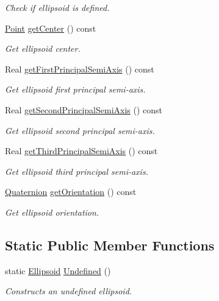 \begin{DoxyCompactItemize}
\begin{DoxyCompactList}\small\item\em Check if ellipsoid is defined. \end{DoxyCompactList}\item 
\hyperlink{classlibrary_1_1math_1_1geom_1_1d3_1_1objects_1_1_point}{Point} \hyperlink{classlibrary_1_1math_1_1geom_1_1d3_1_1objects_1_1_ellipsoid_a646be2506950d250db0fb6610979bb46}{get\+Center} () const
\begin{DoxyCompactList}\small\item\em Get ellipsoid center. \end{DoxyCompactList}\item 
Real \hyperlink{classlibrary_1_1math_1_1geom_1_1d3_1_1objects_1_1_ellipsoid_a8219b05b4c6afcd71e915d10b6129baf}{get\+First\+Principal\+Semi\+Axis} () const
\begin{DoxyCompactList}\small\item\em Get ellipsoid first principal semi-\/axis. \end{DoxyCompactList}\item 
Real \hyperlink{classlibrary_1_1math_1_1geom_1_1d3_1_1objects_1_1_ellipsoid_abdc2cc0bed7d473f0d4f572afd0de054}{get\+Second\+Principal\+Semi\+Axis} () const
\begin{DoxyCompactList}\small\item\em Get ellipsoid second principal semi-\/axis. \end{DoxyCompactList}\item 
Real \hyperlink{classlibrary_1_1math_1_1geom_1_1d3_1_1objects_1_1_ellipsoid_a62b97423985083db726d34eced6b58ae}{get\+Third\+Principal\+Semi\+Axis} () const
\begin{DoxyCompactList}\small\item\em Get ellipsoid third principal semi-\/axis. \end{DoxyCompactList}\item 
\hyperlink{classlibrary_1_1math_1_1geom_1_1trf_1_1rot_1_1_quaternion}{Quaternion} \hyperlink{classlibrary_1_1math_1_1geom_1_1d3_1_1objects_1_1_ellipsoid_a8d426da587827eff577de4edb58ae417}{get\+Orientation} () const
\begin{DoxyCompactList}\small\item\em Get ellipsoid orientation. \end{DoxyCompactList}\end{DoxyCompactItemize}
\subsection*{Static Public Member Functions}
\begin{DoxyCompactItemize}
\item 
static \hyperlink{classlibrary_1_1math_1_1geom_1_1d3_1_1objects_1_1_ellipsoid}{Ellipsoid} \hyperlink{classlibrary_1_1math_1_1geom_1_1d3_1_1objects_1_1_ellipsoid_affcef36f736e6d21a0246a149b8fb688}{Undefined} ()
\begin{DoxyCompactList}\small\item\em Constructs an undefined ellipsoid. \end{DoxyCompactList}\end{DoxyCompactItemize}
